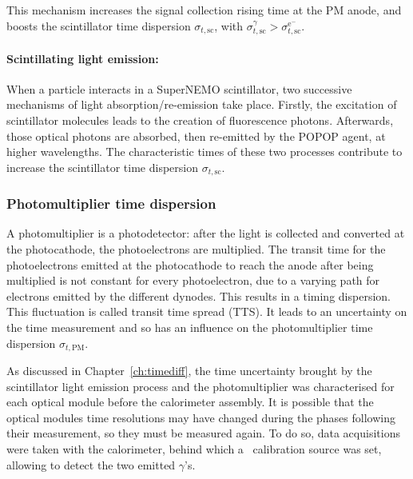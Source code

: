 This mechanism increases the signal collection rising time at the PM anode, and boosts the scintillator time dispersion $\sigma_{t,\text{sc}}$, with $\sigma_{t,\text{sc}}^{\gamma}>\sigma_{t,\text{sc}}^{\text{e}^{-}}$.

\paragraph{Scintillating light emission:}
When a particle interacts in a SuperNEMO scintillator, two successive mechanisms of light absorption/re-emission take place.
Firstly, the excitation of scintillator molecules leads to the creation of fluorescence photons.
Afterwards, those optical photons are absorbed, then re-emitted by the POPOP agent, at higher wavelengths.
The characteristic times of these two processes contribute to increase the scintillator time dispersion $\sigma_{t,\text{sc}}$.

\subsubsection*{Photomultiplier time dispersion}

A photomultiplier is a photodetector: after the light is collected and converted at the photocathode, the photoelectrons are multiplied.
The transit time for the photoelectrons emitted at the photocathode to reach the anode after being multiplied is not constant for every photoelectron, due to a varying path for electrons emitted by the different dynodes.
This results in a timing dispersion.
This fluctuation is called transit time spread (TTS).
It leads to an uncertainty on the time measurement and so has an influence on the photomultiplier time dispersion $\sigma_{t,\text{PM}}$.

As discussed in Chapter~\ref{ch:timediff}, the time uncertainty brought by the scintillator light emission process and the photomultiplier was characterised for each optical module before the calorimeter assembly.
It is possible that the optical modules time resolutions may have changed during the phases following their measurement, so they must be measured again.
To do so, data acquisitions were taken with the calorimeter, behind which a \Co\ calibration source was set, allowing to detect the two emitted $\gamma$'s.



